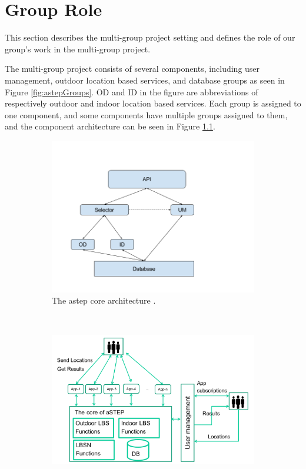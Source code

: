 \chapter{Group Role}
This section describes the multi-group project setting and defines the role of our group’s work in the multi-group project.

The multi-group project consists of several components, including user management, outdoor location based services, and database groups as seen in Figure \ref{fig:astepGroups}.
OD and ID in the figure are abbreviations of respectively outdoor and indoor location based services.
Each group is assigned to one component, and some components have multiple groups assigned to them, and the component architecture can be seen in Figure \ref{fig:astepCore}.

\begin{figure}[h!]
	\centering
	\begin{subfigure}[b]{0.48\textwidth}
		\includegraphics[width=\textwidth]{figures/InformalArchitecture.png}
		\caption{The \gls{astep} core architecture \cite{astepArchitectureImage}. }
		\label{fig:astepCore}
	\end{subfigure}
	~ %
	\begin{subfigure}[b]{0.48\textwidth}
		\includegraphics[width=\textwidth]{figures/astepGroups.png}

\end{subfigure}
\end{figure}
